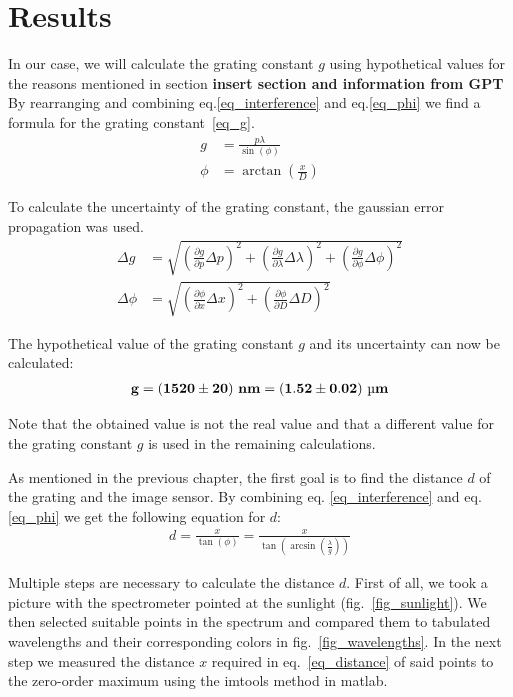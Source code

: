 \section{Results}\label{sec_results}

In our case, we will calculate the grating constant $g$ using hypothetical values for the reasons mentioned in section \textbf{insert section and information from GPT}
By rearranging and combining eq.\ref{eq_interference} and eq.\ref{eq_phi} we find a formula for the grating constant~\ref{eq_g}.
\begin{align}
    g &= \frac{p \lambda}{\sin(\phi)} \label{eq_g}\\
    \phi &= \arctan \left( \frac{x}{D} \right)
\end{align}

To calculate the uncertainty of the grating constant, the gaussian error propagation was used.
\begin{align}
    \Delta g &= \sqrt{\left( \frac{\partial g}{\partial p} \Delta p \right)^2 + \left( \frac{\partial g}{\partial \lambda} \Delta \lambda \right)^2 + \left( \frac{\partial g}{\partial \phi} \Delta \phi \right)^2}\\
    \Delta \phi &= \sqrt{\left( \frac{\partial \phi}{\partial x} \Delta x \right)^2 + \left( \frac{\partial \phi}{\partial D} \Delta D \right)^2}
\end{align}

The hypothetical value of the grating constant $g$ and its uncertainty can now be calculated:
\begin{align}
    \bf g = (1520 \pm 20) ~\si{\bf\nano\meter} = (1.52 \pm 0.02) ~\si{\bf\micro\meter} \label{res_g}
\end{align}

Note that the obtained value is not the real value and that a different value for the grating constant $g$ \cite{src_grating_constant} is used in the remaining calculations.

As mentioned in the previous chapter, the first goal is to find the distance $d$ of the grating
and the image sensor.
By combining eq. \ref{eq_interference} and eq. \ref{eq_phi} we get the following equation for $d$:
\begin{align}
    d = \frac{x}{\tan(\phi)} = \frac{x}{\tan(\arcsin(\frac{\lambda}{g}))} \label{eq_distance}
\end{align}

Multiple steps are necessary to calculate the distance $d$.
First of all, we took a picture with the spectrometer pointed at the sunlight (fig.~\ref{fig_sunlight}). We then selected suitable 
points in the spectrum and compared them to tabulated wavelengths and their corresponding colors 
in fig.~\ref{fig_wavelengths}. In the next step we measured the distance $x$ required in eq.~\ref{eq_distance} of said points to the zero-order maximum
using the imtools method in matlab.

